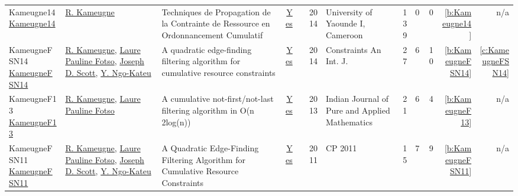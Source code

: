 {\begin{longtable}{>{\raggedright\arraybackslash}p{3cm}>{\raggedright\arraybackslash}p{6cm}>{\raggedright\arraybackslash}p{6.5cm}rrrp{2.5cm}rrrrr}
Kameugne14 \href{http://cp2013.a4cp.org/sites/default/files/roger_kameugne_-_propagation_techniques_of_resource_constraint_for_cumulative_scheduling.pdf}{Kameugne14} & \hyperref[auth:a10]{R. Kameugne} & Techniques de Propagation de la Contrainte de Ressource en Ordonnancement Cumulatif & \href{../works/Kameugne14.pdf}{Yes} & \cite{Kameugne14} & 2014 & University of Yaounde I, Cameroon & 139 & 0 & 0 & \ref{b:Kameugne14} & n/a\\
KameugneFSN14 \href{https://doi.org/10.1007/s10601-013-9157-z}{KameugneFSN14} & \hyperref[auth:a10]{R. Kameugne}, \hyperref[auth:a131]{Laure Pauline Fotso}, \hyperref[auth:a132]{Joseph D. Scott}, \hyperref[auth:a133]{Y. Ngo{-}Kateu} & A quadratic edge-finding filtering algorithm for cumulative resource constraints & \href{../works/KameugneFSN14.pdf}{Yes} & \cite{KameugneFSN14} & 2014 & Constraints An Int. J. & 27 & 6 & 10 & \ref{b:KameugneFSN14} & \ref{c:KameugneFSN14}\\
KameugneF13 \href{http://dx.doi.org/10.1007/s13226-013-0005-z}{KameugneF13} & \hyperref[auth:a10]{R. Kameugne}, \hyperref[auth:a131]{Laure Pauline Fotso} & A cumulative not-first/not-last filtering algorithm in O(n 2log(n)) & \href{../works/KameugneF13.pdf}{Yes} & \cite{KameugneF13} & 2013 & Indian Journal of Pure and Applied Mathematics & 21 & 6 & 4 & \ref{b:KameugneF13} & n/a\\
KameugneFSN11 \href{https://doi.org/10.1007/978-3-642-23786-7_37}{KameugneFSN11} & \hyperref[auth:a10]{R. Kameugne}, \hyperref[auth:a131]{Laure Pauline Fotso}, \hyperref[auth:a132]{Joseph D. Scott}, \hyperref[auth:a133]{Y. Ngo{-}Kateu} & A Quadratic Edge-Finding Filtering Algorithm for Cumulative Resource Constraints & \href{../works/KameugneFSN11.pdf}{Yes} & \cite{KameugneFSN11} & 2011 & CP 2011 & 15 & 7 & 9 & \ref{b:KameugneFSN11} & n/a\\
\end{longtable}
}

\clearpage
